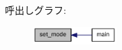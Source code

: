 呼出しグラフ:\nopagebreak
\begin{figure}[H]
\begin{center}
\leavevmode
\includegraphics[width=90pt]{rdma-common_8h_abe5494f2e0e27dd073dafa13b2f89f5e_icgraph}
\end{center}
\end{figure}
